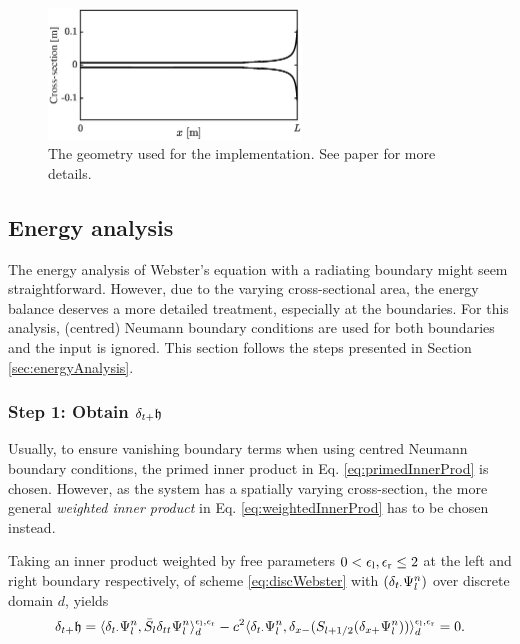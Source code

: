 {\renewcommand{\arraystretch}{1}

\hspace{0.1\textwidth}
\begin{figure}[h]
    \centering
    \includegraphics[width=0.6\textwidth]{figures/resonators/brass/geometryWebster.eps}
    \caption{The geometry used for the implementation. See paper \citeP[H] for more details. \label{fig:geometryWebster}}
\end{figure}


\subsection{Energy analysis}\label{sec:energyAnalysisWebster}
The energy analysis of Webster's equation with a radiating boundary might seem straightforward. However, due to the varying cross-sectional area, the energy balance deserves a more detailed treatment, especially at the boundaries. For this analysis, (centred) Neumann boundary conditions are used for both boundaries and the input is ignored. This section follows the steps presented in Section \ref{sec:energyAnalysis}.%

\subsubsection{Step 1: Obtain $\delta_{t+} \mathfrak{h}$}
Usually, to ensure vanishing boundary terms when using centred Neumann boundary conditions, the primed inner product in Eq. \eqref{eq:primedInnerProd} is chosen. However, as the system has a spatially varying cross-section, the more general \textit{weighted inner product} in Eq. \eqref{eq:weightedInnerProd} has to be chosen instead.

Taking an inner product weighted by free parameters $0 < \epsilon_\text{l}, \epsilon_\text{r} \leq 2$ at the left and right boundary respectively, of scheme \eqref{eq:discWebster} with $(\delta_{t\cdot} \Psi_l^n)$ over discrete domain $d$, yields 
\begin{equation}\label{eq:powerBalanceWebster}
    \delta_{t+} \mathfrak{h} = \langle \delta_{t\cdot}\Psi_l^n ,\bar{S}_l \delta_{tt}\Psi^n_l\rangle_d^{\epsilon_\text{l},\epsilon_\text{r}} - c^2\langle\delta_{t\cdot}\Psi_l^n, \delta_{x-}(S_{l+1/2}(\delta_{x+}\Psi_l^n))\rangle_d^{\epsilon_\text{l},\epsilon_\text{r}} = 0.
\end{equation}

}
